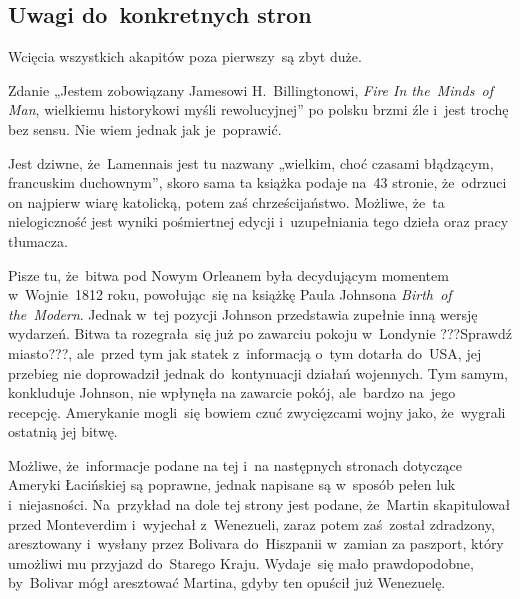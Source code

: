\documentclass[a4paper,11pt]{article}
\begin{document}
\subsection{Uwagi do~konkretnych stron}



\noindent
{} Wcięcia wszystkich akapitów poza pierwszy~są zbyt duże.

\VerSpaceFour





\noindent
{} Zdanie „Jestem zobowiązany Jamesowi H.~Billingtonowi,
\textit{Fire In the~Minds~of Man}, wielkiemu historykowi myśli
rewolucyjnej” po polsku brzmi źle i~jest trochę bez sensu. Nie wiem jednak
jak je~poprawić.

\VerSpaceFour





\noindent
{} Jest dziwne, że~Lamennais jest tu nazwany „wielkim, choć czasami
błądzącym, francuskim duchownym”, skoro sama ta książka podaje na~43
stronie, że~odrzuci on najpierw wiarę katolicką, potem zaś chrześcijaństwo.
Możliwe, że~ta nielogiczność jest wyniki pośmiertnej edycji i~uzupełniania
tego dzieła oraz pracy tłumacza.

\VerSpaceFour





\noindent
{} Pisze tu, że~bitwa pod Nowym Orleanem była decydującym momentem
w~Wojnie~1812 roku, powołując~się na książkę Paula Johnsona
\textit{Birth~of the~Modern}. Jednak w~tej pozycji Johnson przedstawia
zupełnie inną wersję wydarzeń. Bitwa ta rozegrała~się już po zawarciu
pokoju w~Londynie ???Sprawdź miasto???, ale~przed tym jak statek
z~informacją o~tym dotarła do~USA, jej przebieg nie doprowadził jednak
do~kontynuacji działań wojennych. Tym samym, konkluduje Johnson, nie
wpłynęła na zawarcie pokój, ale~bardzo na~jego recepcję. Amerykanie
mogli~się bowiem czuć zwycięzcami wojny jako, że~wygrali ostatnią jej
bitwę.

\VerSpaceFour





\noindent
{} Możliwe, że~informacje podane na tej i~na następnych stronach
dotyczące Ameryki Łacińskiej są poprawne, jednak napisane są w~sposób pełen
luk i~niejasności. Na~przykład na dole tej strony jest podane, że~Martin
skapitulował przed Monteverdim i~wyjechał z~Wenezueli, zaraz potem
zaś~został zdradzony, aresztowany i~wysłany przez Bolivara do~Hiszpanii
w~zamian za paszport, który umożliwi mu przyjazd do~Starego Kraju.
Wydaje~się mało prawdopodobne, by~Bolivar mógł aresztować Martina, gdyby
ten opuścił już Wenezuelę.
\end{document}
